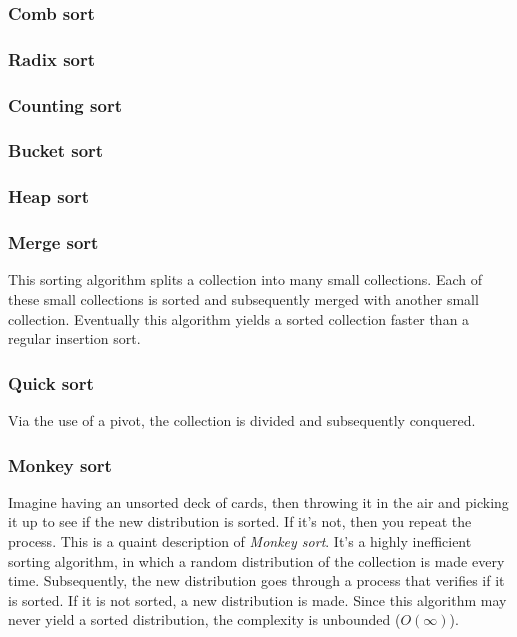 \documentclass{article}
\begin{document}
\subsubsection{Comb sort}

\subsubsection{Radix sort}

\subsubsection{Counting sort}

\subsubsection{Bucket sort}

\subsubsection{Heap sort}

\subsubsection{Merge sort}
This sorting algorithm splits a collection into many small collections.
Each of these small collections is sorted and subsequently merged with another small collection.
Eventually this algorithm yields a sorted collection faster than a regular insertion sort.

\subsubsection{Quick sort}
Via the use of a pivot, the collection is divided and subsequently conquered.

\subsubsection{Monkey sort}
Imagine having an unsorted deck of cards, then throwing it in the air and picking it up to see if the new distribution is sorted.
If it's not, then you repeat the process. This is a quaint description of {\em Monkey sort}.
It's a highly inefficient sorting algorithm, in which a random distribution of the collection is made every time.
Subsequently, the new distribution goes through a process that verifies if it is sorted. If it is not sorted, a new distribution is made.
Since this algorithm may never yield a sorted distribution, the complexity is unbounded ($O(\infty)$).
\end{document}
